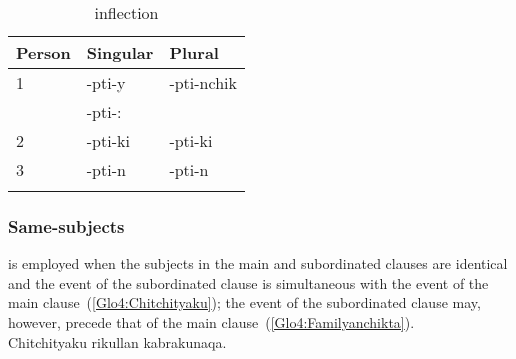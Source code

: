 \begin{table}[!ht]
\small\centering
\caption{ inflection}\label{Tab25a}
\begin{tabular}{lll}
\lsptoprule
Person		& Singular		& Plural	\\
\midrule
1 & -pti-y\tss{\AMV,\LT} 	&-pti-nchik\\
 & -pti-:\tss{\ACH,\CH,\SP}&			\\[2ex]
2 &-pti-ki 					&-pti-ki\\[2ex]
3 &-pti-n 					&-pti-n\\
\lspbottomrule
\end{tabular}
\end{table}

\begin{table}[!ht]
\small\centering
\caption{ inflection -- actor-object suffixes}\label{Tab25b}
\end{table}

\subsubsection{Same-subjects }
 is employed when the subjects in the main and subordinated clauses are identical and the event of the subordinated clause is simultaneous with the event of the main clause~(\ref{Glo4:Chitchityaku}); the event of the subordinated clause may, however, precede that of the main clause~(\ref{Glo4:Familyanchikta}).\\

%
{Chitchityaku rikullan kabrakunaqa.}%
{}%
{}{}%

